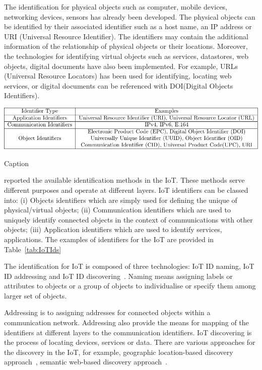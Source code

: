 The identification for physical objects such as computer, mobile devices, networking devices, sensors has already been developed.
The physical objects can be identified by their associated identifier such as a host name, an IP address or URI (Universal Resource Identifier).
The identifiers may contain the additional information of the relationship of physical objects or their locations.
Moreover, the technologies for identifying virtual objects such as services, datastores, web objects, digital documents have also been implemented.
For example, URLs (Universal Resource Locators) has been used for identifying, locating web services, or digital documents can be referenced with DOI(Digital Objects Identifiers).

\begin{table}[ht!]
    \centering
    \includegraphics[scale=.85]{Table/2-1-identfication.pdf}
    \caption{Caption}
    \label{tab:IoTIds}
\end{table}

\cite{Presser:2016} reported the available identification methods in the IoT. 
These methods serve different purposes and operate at different layers.
IoT identifiers can be classed into: 
(i) Objects identifiers which are simply used for defining the unique of physical/virtual objects;
(ii) Communication identifiers which are used to uniquely identify connected objects in the context of communications with other objects;
(iii) Application identifiers which are used to identify services, applications. 
The examples of identifiers for the IoT are provided in Table~\ref{tab:IoTIds}

The identification for IoT is composed of three technologies: IoT ID naming, IoT ID addressing and IoT ID discovering~\citep{Presser:2016}.
Naming means assigning labels or attributes to objects or a group of objects to individualise or specify them among larger set of objects.

Addressing is to assigning addresses for connected objects within a communication network.
Addressing also provide the means for mapping of the identifiers at different layers to the communication identifiers.
IoT discovering is the process of locating devices, services or data. 
There are various approaches for the discovery in the IoT, for example, geographic location-based discovery approach~\citep{Dinh:2017}, semantic web-based discovery approach~\citep{Serena:2017}.

